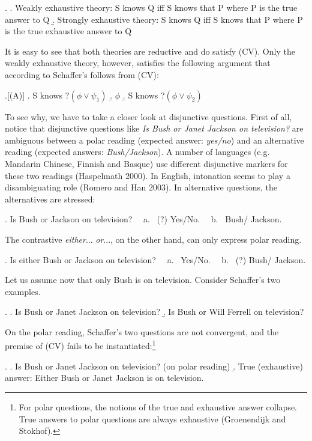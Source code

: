 \ex. \label{ws}\a. Weakly exhaustive theory:
 S knows Q iff S knows that P where P is the true answer to
 Q
\b. Strongly exhaustive theory:
   S knows Q iff S knows that P where P is the true exhaustive answer to
   Q


\noindent It is easy to see that both theories are reductive and
do satisfy (CV). Only the weakly exhaustive theory, however,
satisfies the following argument that according to Schaffer's
follows from (CV):

 \ex.[(A)] \a. S knows ?$ (\phi \vee \psi_1)$
 \b.  $\phi$
 \b. S knows ?$ (\phi \vee \psi_2)$


\noindent  To see why, we have to take a closer look at
disjunctive questions. First of all, notice that disjunctive
questions like {\it Is Bush or Janet Jackson on television?} are
ambiguous between a polar reading (expected answer: {\it yes/no})
and an alternative reading (expected answers: {\it Bush/Jackson}).
A number of languages (e.g. Mandarin Chinese, Finnish and Basque)
use different disjunctive markers for these two readings
(Haspelmath 2000). In English, intonation seems to play a
disambiguating role (Romero and Han 2003). In alternative
questions, the alternatives are stressed:


\ex. Is {\sc Bush} or {\sc Jackson} on television?  \ \ a. \ (?)
Yes/No. \ \ b. \ Bush/ Jackson.


\noindent The contrastive  {\it either}... {\it or}..., on the
other hand, can only express polar reading.

 \ex. Is either Bush  or   Jackson  on television?  \ \ a. \ Yes/No. \ \ b. \  (?) Bush/ Jackson.



\noindent Let us assume now that only Bush is on television.
Consider Schaffer's two examples.

  \ex. \a. Is Bush or Janet Jackson on television?
 \b.  Is Bush or Will Ferrell on television?

On the polar reading, Schaffer's two questions are not convergent,
and the premise of (CV) fails to be instantiated:\footnote{For
polar questions, the notions of the true and exhaustive answer
collapse. True answers to polar questions are always exhaustive
(Groenendijk and Stokhof).}

\ex.     \a. Is   Bush or Janet Jackson on television?  (on polar
reading) \b. True (exhaustive) answer: Either Bush or Janet
Jackson is on television.


